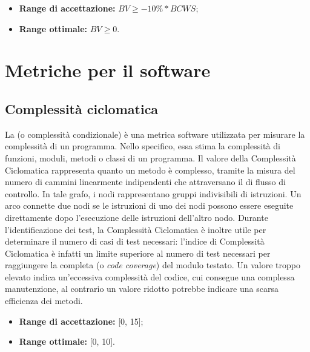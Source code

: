 \documentclass[openany,12pt,a4paper]{report}
\begin{document}
\begin{itemize}
    \item \textbf{Range di accettazione:} $ BV \geq -10\%*BCWS $;
    
    \item \textbf{Range ottimale:} $ BV \geq 0 $.
\end{itemize}


\section{Metriche per il software}

\subsection{Complessità ciclomatica}

La  (o complessità condizionale) è una metrica software utilizzata per misurare la complessità di un programma. 
Nello specifico, essa stima la complessità di funzioni, moduli, metodi o classi di un programma. Il valore della Complessità Ciclomatica rappresenta quanto un metodo è complesso, tramite la misura del numero di cammini linearmente indipendenti che attraversano il  di flusso di controllo. In tale grafo, i nodi rappresentano gruppi indivisibili di istruzioni. Un arco connette due nodi se le istruzioni di uno dei nodi possono essere eseguite
direttamente dopo l'esecuzione delle istruzioni dell'altro nodo. Durante l’identificazione dei test, la Complessità Ciclomatica è inoltre utile per determinare il numero di casi di test necessari: l’indice di Complessità Ciclomatica è infatti un limite superiore al numero di test necessari per raggiungere la completa  (o \textit{code coverage}) del modulo testato.
Un valore troppo elevato indica un'eccessiva complessità del codice, cui consegue una complessa manutenzione, al contrario un valore ridotto potrebbe indicare una scarsa efficienza dei metodi.

\begin{itemize}
    \item \textbf{Range di accettazione:} [0, 15];
    
    \item \textbf{Range ottimale:} [0, 10].
\end{itemize}
\end{document}
